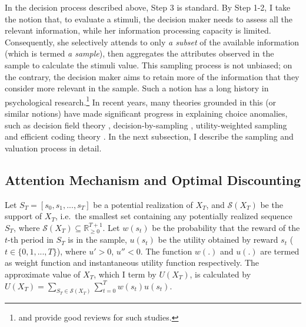 \documentclass[
  12pt,
]{article}
\begin{document}
In the decision process described above, Step 3 is standard. By Step
1-2, I take the notion that, to evaluate a stimuli, the decision maker
needs to assess all the relevant information, while her information
processing capacity is limited. Consequently, she selectively attends to
only \emph{a subset} of the available information (which is termed
\emph{a sample}), then aggregates the attributes observed in the sample
to calculate the stimuli value. This sampling process is not unbiased;
on the contrary, the decision maker aims to retain more of the
information that they consider more relevant in the sample. Such a
notion has a long history in psychological research.\footnote{\citet{weber_mindful_2009}
  and \citet{chun_taxonomy_2011} provide good reviews for such studies.}
In recent years, many theories grounded in this (or similar notions)
have made significant progress in explaining choice anomalies, such as
decision field theory \citep{busemeyer_decision_1993},
decision-by-sampling \citep{stewart_decision_2006}, utility-weighted
sampling \citep{lieder_overrepresentation_2018} and efficient coding
theory \citep{heng_efficient_2020}. In the next subsection, I describe
the sampling and valuation process in detail.

\hypertarget{attention-mechanism-and-optimal-discounting}{%
\subsection{Attention Mechanism and Optimal
Discounting}\label{attention-mechanism-and-optimal-discounting}}

Let \(S_T=[s_0,s_1,...,s_T]\) be a potential realization of \(X_T\), and
\(\mathcal{S}(X_T)\) be the support of \(X_T\), i.e.~the smallest set
containing any potentially realized sequence \(S_T\), where
\(\mathcal{S}(X_T)\subseteq \mathbb{R}_{\geq 0}^{T+1}\). Let \(w(s_t)\)
be the probability that the reward of the \(t\)-th period in \(S_T\) is
in the sample, \(u(s_t)\) be the utility obtained by reward \(s_t\)
(\(t \in \{0,1,...,T\}\)), where \(u'>0\), \(u''<0\). The function
\(w(.)\) and \(u(.)\) are termed as weight function and instantaneous
utility function respectively. The approximate value of \(X_T\), which I
term by \(U(X_T)\), is calculated by
\(U(X_T)=\sum_{S_T\in \mathcal{S}(X_T)}\sum_{t=0}^T w(s_t) u(s_t)\).
\end{document}
